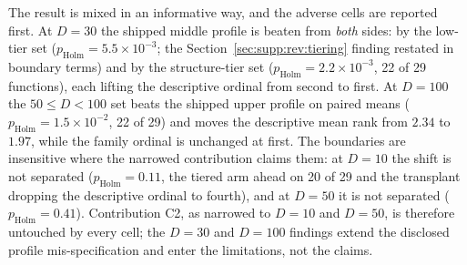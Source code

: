 \documentclass[algorithms,article,submit,moreauthors,pdftex]{Definitions/mdpi}
\begin{document}
The result is mixed in an informative way, and the adverse cells are reported
first.  At $D = 30$ the shipped middle profile is beaten from \emph{both}
sides: by the low-tier set ($p_{\mathrm{Holm}} = 5.5\times10^{-3}$; the
Section~\ref{sec:supp:rev:tiering} finding restated in boundary terms) and by
the structure-tier set ($p_{\mathrm{Holm}} = 2.2\times10^{-3}$, 22 of 29
functions), each lifting the descriptive ordinal from second to first.  At
$D = 100$ the $50 \leq D < 100$ set beats the shipped upper profile on paired
means ($p_{\mathrm{Holm}} = 1.5\times10^{-2}$, 22 of 29) and moves the
descriptive mean rank from $2.34$ to $1.97$, while the family
ordinal is unchanged at first.  The boundaries are insensitive where the
narrowed contribution claims them: at $D = 10$ the shift is not separated
($p_{\mathrm{Holm}} = 0.11$, the tiered arm ahead on 20 of 29 and the
transplant dropping the descriptive ordinal to fourth), and at $D = 50$ it is
not separated ($p_{\mathrm{Holm}} = 0.41$).  Contribution C2, as narrowed to
$D = 10$ and $D = 50$, is therefore untouched by every cell; the $D = 30$ and
$D = 100$ findings extend the disclosed profile mis-specification and enter
the limitations, not the claims.

\clearpage
\end{document}
